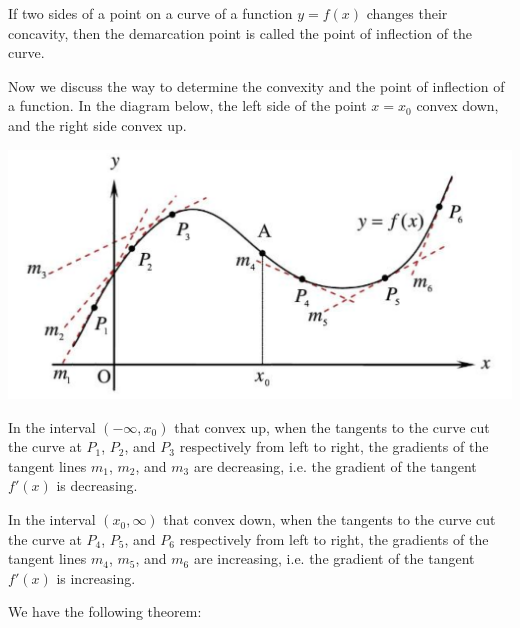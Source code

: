 \documentclass{report}
\begin{document}
If two sides of a point on a curve of a function $y = f(x)$ changes their
concavity, then the demarcation point is called the point of inflection of the
curve.

Now we discuss the way to determine the convexity and the point of inflection
of a function. In the diagram below, the left side of the point $x = x_0$
convex down, and the right side convex up.
\begin{center}
    \includegraphics[scale=0.25]{assets/26-14.png}
\end{center}
In the interval $(-\infty, x_0)$ that convex up, when the tangents to the curve cut the curve at $P_1$, $P_2$, and $P_3$ respectively from left to right, the gradients of the tangent lines $m_1$, $m_2$, and $m_3$ are decreasing, i.e. the gradient of the tangent $f'(x)$ is decreasing.

In the interval $(x_0, \infty)$ that convex down, when the tangents to the
curve cut the curve at $P_4$, $P_5$, and $P_6$ respectively from left to right,
the gradients of the tangent lines $m_4$, $m_5$, and $m_6$ are increasing, i.e.
the gradient of the tangent $f'(x)$ is increasing.

We have the following theorem:
\begin{center}
\end{center}
\end{document}
